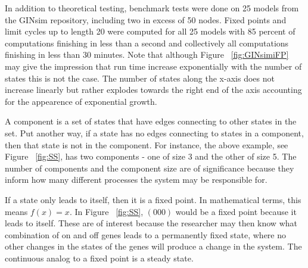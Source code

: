 \documentclass[11pt]{amsart}
\begin{document}
In addition to theoretical testing, benchmark tests were done on 25 models from the GINsim repository, including two in excess of 50 nodes.  Fixed points and limit cycles up to length 20 were computed for all 25 models with 85 percent of computations finishing in less than a second and collectively all computations finishing in less than 30 minutes.
Note that although Figure ~\ref{fig:GINsimiFP} may give the impression that run time increase exponentially with the number of states this is not the case. The number of states along the x-axis does not increase linearly but rather explodes towards the right end of the axis accounting for the appearence of exponential growth.

A component is a set of states that have edges connecting to other states in the set. Put another way, if a state has no edges connecting to states in a component, then that state is not in the component. For instance, the above example, see Figure ~\ref{fig:SS}, has two components - one of size 3 and the other of size 5. The number of components and the component size are of significance because they inform how many different processes the system may be responsible for.

If a state only leads to itself, then it is a fixed point. In mathematical terms, this means $f(x) = x$. In Figure ~\ref{fig:SS}, $(000)$ would be a fixed point because it leads to itself. These are of interest because the researcher may then know what combination of on and off genes leads to a permanently fixed state, where no other changes in the states of the genes will produce a change in the system.  The continuous analog to a fixed point is a steady state.
\end{document}
